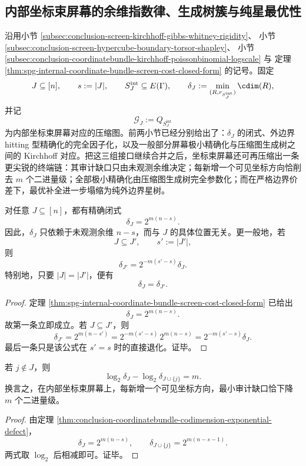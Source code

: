\subsection{内部坐标束屏幕的余维指数律、生成树簇与纯星最优性}\label{subsec:conclusion-coordinatebundle-codimension-tree-star-kirchhoff-rigidity}

沿用小节 \ref{subsec:conclusion-screen-kirchhoff-gibbs-whitney-rigidity}、
小节 \ref{subsec:conclusion-screen-hypercube-boundary-torsor-shapley}、
小节 \ref{subsec:conclusion-coordinatebundle-kirchhoff-poissonbinomial-logscale} 与
定理 \ref{thm:spg-internal-coordinate-bundle-screen-cost-closed-form}
的记号。固定
\[
J\subseteq [n],
\qquad
s:=|J|,
\qquad
S_J^{\mathrm{int}}\subseteq E(\Gamma),
\qquad
\delta_J:=\min_{(R,r_{S_J^{\mathrm{int}}})}\cdim(R),
\]
并记
\[
\mathcal G_J:=Q_{S_J^{\mathrm{int}}}
\]
为内部坐标束屏幕对应的压缩图。前两小节已经分别给出了：\(\delta_J\) 的闭式、外边界 hitting 型精确化的完全因子化，以及一般部分屏幕极小精确化与压缩图生成树之间的 Kirchhoff 对应。把这三组接口继续合并之后，坐标束屏幕还可再压缩出一条更尖锐的终端链：其审计缺口只由未观测余维决定；每新增一个可见坐标方向恰削去 \(m\) 个二进量级；全部极小精确化由压缩图生成树完全参数化；而在严格边界价差下，最优补全进一步塌缩为纯外边界星树。

\begin{theorem}[内部坐标束屏幕的等秩等价与余维指数律]\label{thm:conclusion-coordinatebundle-codimension-exponential-defect}
对任意 \(J\subseteq [n]\)，都有精确闭式
\[
\delta_J=2^{m(n-s)}.
\]
因此，\(\delta_J\) 只依赖于未观测余维 \(n-s\)，而与 \(J\) 的具体位置无关。更一般地，若
\[
J\subseteq J',
\qquad
s':=|J'|,
\]
则
\[
\delta_{J'}=2^{-m(s'-s)}\delta_J.
\]
特别地，只要 \(|J|=|J'|\)，便有
\[
\delta_J=\delta_{J'}.
\]
\end{theorem}
\begin{proof}
定理 \ref{thm:spg-internal-coordinate-bundle-screen-cost-closed-form} 已给出
\[
\delta_J=2^{m(n-s)}.
\]
故第一条立即成立。若 \(J\subseteq J'\)，则
\[
\delta_{J'}
=2^{m(n-s')}
=2^{-m(s'-s)}\,2^{m(n-s)}
=2^{-m(s'-s)}\delta_J.
\]
最后一条只是该公式在 \(s'=s\) 时的直接退化。证毕。
\end{proof}

\begin{corollary}\label{cor:conclusion-coordinatebundle-one-coordinate-worth-m-bits}
若 \(j\notin J\)，则
\[
\log_2\delta_J-\log_2\delta_{J\cup\{j\}}=m.
\]
换言之，在内部坐标束屏幕上，每新增一个可见坐标方向，最小审计缺口恰下降 \(m\) 个二进量级。
\end{corollary}
\begin{proof}
由定理 \ref{thm:conclusion-coordinatebundle-codimension-exponential-defect}，
\[
\delta_J=2^{m(n-s)},
\qquad
\delta_{J\cup\{j\}}=2^{m(n-s-1)}.
\]
两式取 \(\log_2\) 后相减即可。证毕。
\end{proof}

